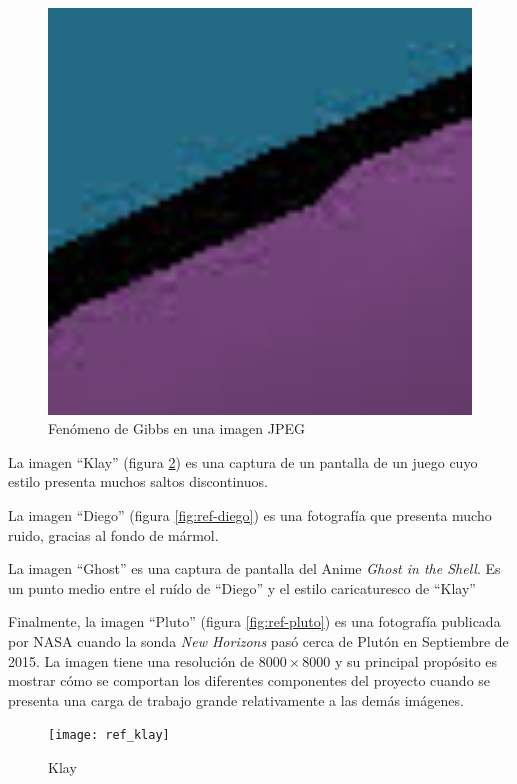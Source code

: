 \begin{figure}[b]
    \includegraphics[width=1.0\textwidth]{gibbs}
    \caption{Fenómeno de Gibbs en una imagen JPEG}
    \label{fig:gibbs}
\end{figure}

La imagen ``Klay'' (figura \ref{fig:ref-klay}) es una captura de un pantalla de
un juego cuyo estilo presenta muchos saltos discontinuos.

La imagen ``Diego'' (figura \ref{fig:ref-diego}) es una fotografía que presenta
mucho ruido, gracias al fondo de mármol.

La imagen ``Ghost'' es una captura de pantalla del Anime \emph{Ghost in the
Shell}. Es un punto medio entre el ruído de ``Diego'' y el estilo caricaturesco
de ``Klay''

Finalmente, la imagen ``Pluto'' (figura \ref{fig:ref-pluto}) es una fotografía
publicada por NASA cuando la sonda \emph{New Horizons} pasó cerca de Plutón en
Septiembre de 2015. La imagen tiene una resolución de $8000\times8000$ y su
principal propósito es mostrar cómo se comportan los diferentes componentes del
proyecto cuando se presenta una carga de trabajo grande relativamente a las
demás imágenes.

\begin{figure}[b]
    \texttt{[image: ref\_klay]}
    \caption{Klay}
    \label{fig:ref-klay}
\end{figure}

